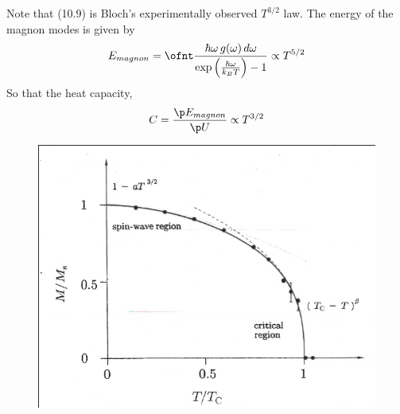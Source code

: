 \documentclass[a4paper, 11pt, normalem]{report}
\begin{document}
Note that (10.9) is Bloch's experimentally observed $T^{3/2}$ law. 
The energy of the magnon modes is given by 
\begin{equation}
    E_{magnon} = \ofnt \frac{\hbar\omega\,g(\omega)\,d\omega}{\exp\left(\frac{\hbar\omega}{k_BT}\right) - 1} \propto T^{5/2}
\end{equation}
So that the heat capacity,
\begin{equation}
    C = \frac{\p E_{magnon}}{\p U} \propto T^{3/2}
\end{equation}
\begin{figure}[H]
    \centering
    \includegraphics[scale=0.5]{critspin.png}
\end{figure}
\end{document}
